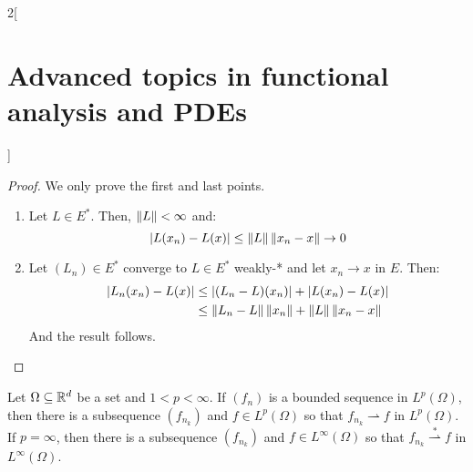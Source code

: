 \documentclass[../../../main_math.tex]{subfiles}
\begin{document}
\begin{multicols}{2}[\section{Advanced topics in functional analysis and PDEs}]
\begin{theorem}
\begin{enumerate}
    \end{enumerate}
  \end{theorem}
  \begin{proof}
    We only prove the first and last points.
    \begin{enumerate}
      \item Let $L\in E^*$. Then, $\left\|L\right\|< \infty$ and:
            $$
              \abs{L(x_n)-L(x)}\leq \left\|L\right\|\left\|x_n-x\right\|\to 0
            $$
            \setcounter{enumi}{3}
      \item Let $(L_n)\in E^*$ converge to $L\in E^*$ weakly-* and let $x_n\to x$ in $E$. Then:
            \begin{align*}
              \abs{L_n(x_n)-L(x)} & \leq \abs{(L_n-L)(x_n)}+\abs{L(x_n)-L(x)}         \\
                                  & \leq \left\|L_n-L\right\|\left\|x_n\right\|+\left\|L\right\|\left\|x_n -x\right\|
            \end{align*}
            And the result follows.
    \end{enumerate}
  \end{proof}
  \begin{theorem}
    Let $\Omega\subseteq \mathbb{R}^d$ be a set and $1<p<\infty$. If $(f_n)$ is a bounded sequence in $L^p(\Omega)$, then there is a subsequence $(f_{n_k})$ and $f\in L^p(\Omega)$ so that $f_{n_k}\rightharpoonup f$ in $L^p(\Omega)$. If $p=\infty$, then there is a subsequence $(f_{n_k})$ and $f\in L^\infty(\Omega)$ so that $f_{n_k}\overset{*}\rightharpoonup f$ in $L^\infty(\Omega)$.
  \end{theorem}

\end{multicols}
\end{document}
